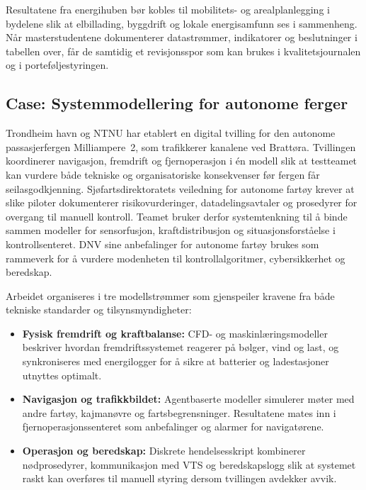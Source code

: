 Resultatene fra energihuben bør kobles til mobilitets- og arealplanlegging i bydelene slik at elbillading, byggdrift og
lokale energisamfunn ses i sammenheng. Når masterstudentene dokumenterer datastrømmer, indikatorer og beslutninger i tabellen
over, får de samtidig et revisjonsspor som kan brukes i kvalitetsjournalen og i porteføljestyringen.

\subsection{Case: Systemmodellering for autonome ferger}
Trondheim havn og NTNU har etablert en digital tvilling for den autonome passasjerfergen Milliampere~2, som trafikkerer kanalene
ved Brattøra.\citep{ntnu2023milliampere2} Tvillingen koordinerer navigasjon, fremdrift og fjernoperasjon i én modell slik at
testteamet kan vurdere både tekniske og organisatoriske konsekvenser før fergen får seilasgodkjenning. Sjøfartsdirektoratets
veiledning for autonome fartøy krever at slike piloter dokumenterer risikovurderinger, datadelingsavtaler og prosedyrer for
overgang til manuell kontroll.\citep{sdir2023autonomefartoy} Teamet bruker derfor systemtenkning til å binde sammen modeller for
sensorfusjon, kraftdistribusjon og situasjonsforståelse i kontrollsenteret. DNV sine anbefalinger for autonome fartøy brukes som
rammeverk for å vurdere modenheten til kontrollalgoritmer, cybersikkerhet og beredskap.\citep{dnv2024autonomous}

Arbeidet organiseres i tre modellstrømmer som gjenspeiler kravene fra både tekniske standarder og tilsynsmyndigheter:
\begin{itemize}
    \item \textbf{Fysisk fremdrift og kraftbalanse:} CFD- og maskinlæringsmodeller beskriver hvordan fremdriftssystemet reagerer
    på bølger, vind og last, og synkroniseres med energilogger for å sikre at batterier og ladestasjoner utnyttes optimalt.
    \item \textbf{Navigasjon og trafikkbildet:} Agentbaserte modeller simulerer møter med andre fartøy, kajmanøvre og
    fartsbegrensninger. Resultatene mates inn i fjernoperasjonssenteret som anbefalinger og alarmer for navigatørene.
    \item \textbf{Operasjon og beredskap:} Diskrete hendelsesskript kombinerer nødprosedyrer, kommunikasjon med VTS og
    beredskapslogg slik at systemet raskt kan overføres til manuell styring dersom tvillingen avdekker avvik.
\end{itemize}

